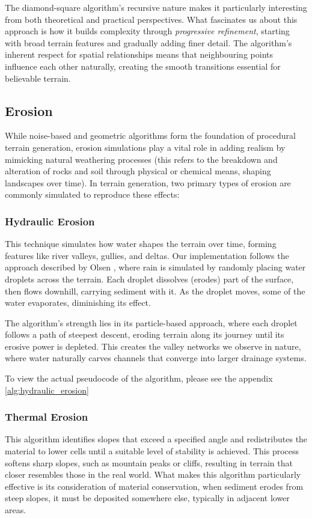 The diamond-square algorithm's recursive nature makes it particularly interesting from both theoretical and practical perspectives. What fascinates us about this approach is how it builds complexity through \textit{progressive refinement}, starting with broad terrain features and gradually adding finer detail. The algorithm's inherent respect for spatial relationships means that neighbouring points influence each other naturally, creating the smooth transitions essential for believable terrain.

\subsection{Erosion}
\label{erosion_1}

While noise-based and geometric algorithms form the foundation of procedural terrain generation, erosion simulations play a vital role in adding realism by mimicking natural weathering processes (this refers to the breakdown and alteration of rocks and soil through physical or chemical means, shaping landscapes over time). In terrain generation, two primary types of erosion are commonly simulated to reproduce these effects: 

\subsubsection{Hydraulic Erosion}
\label{hydra_erosion}
This technique simulates how water shapes the terrain over time, forming features like river valleys, gullies, and deltas. Our implementation follows the approach described by Olsen \citep{Olsen04}, where rain is simulated by randomly placing water droplets across the terrain. Each droplet dissolves (erodes) part of the surface, then flows downhill, carrying sediment with it. As the droplet moves, some of the water evaporates, diminishing its effect. 

The algorithm's strength lies in its particle-based approach, where each droplet follows a path of steepest descent, eroding terrain along its journey until its erosive power is depleted. This creates the valley networks we observe in nature, where water naturally carves channels that converge into larger drainage systems.

To view the actual pseudocode of the algorithm, please see the appendix \ref{alg:hydraulic_erosion}

\subsubsection{Thermal Erosion}
\label{thermal_erosion}
This algorithm identifies slopes that exceed a specified angle and redistributes the material to lower cells until a suitable level of stability is achieved. This process softens sharp slopes, such as mountain peaks or cliffs, resulting in terrain that closer resembles those in the real world. What makes this algorithm particularly effective is its consideration of material conservation, when sediment erodes from steep slopes, it must be deposited somewhere else, typically in adjacent lower areas. 

